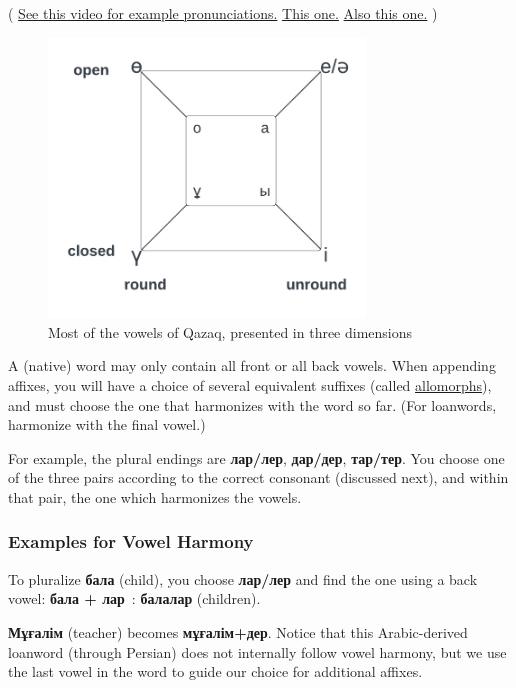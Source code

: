 \documentclass[main.tex]{subfiles}
\begin{document}
( \href{https://www.youtube.com/watch?v=f7ci3zddACg}{See this video for example pronunciations.} \href{https://www.youtube.com/watch?v=Ht5XWZe8SSY}{This one.} \href{https://www.youtube.com/watch?v=SRi_7zrZjyA\&t=96s}{Also this one.} )

\begin{figure}[H]
	\centering
	\includegraphics[width=0.75\textwidth]{kk-vowels-3d.png}
	\caption{Most of the vowels of Qazaq, presented in three dimensions}
\end{figure}

A (native) word may only contain all front or all back vowels. When appending affixes, you will have a choice of several equivalent suffixes (called \href{https://en.wikipedia.org/wiki/Morpheme#Allomorphs}{allomorphs}), and must choose the one that harmonizes with the word so far. (For loanwords, harmonize with the final vowel.)

For example, the plural endings are \textbf{лар/лер}, \textbf{дар/дер}, \textbf{тар/тер}. You choose one of the three pairs according to the correct consonant (discussed next), and within that pair, the one which harmonizes the vowels.

\subsubsection*{Examples for Vowel Harmony}
To pluralize \textbf{бала} (child), you choose \textbf{лар/лер} and find the one using a back vowel:  \textbf{бала + лар} : \textbf{балалар} (children).

\textbf{Мұғалім} (teacher) becomes \textbf{мұғалім+дер}. Notice that this Arabic-derived loanword (through Persian) does not internally follow vowel harmony, but we use the last vowel in the word to guide our choice for additional affixes.
\end{document}
